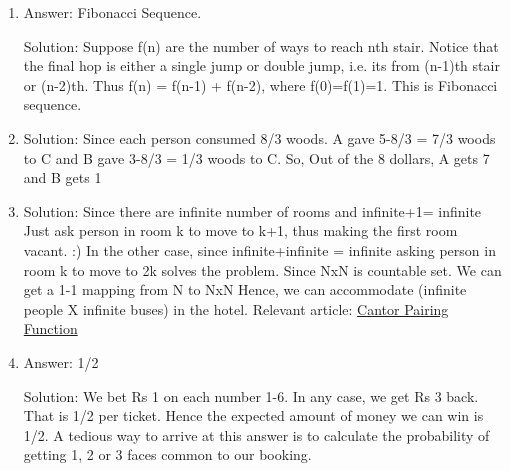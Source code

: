 \begin{enumerate}

\item
Answer: Fibonacci Sequence.
 
Solution: Suppose f(n) are the number of ways to reach nth stair. Notice that the final hop is either a single jump or double jump, i.e. its from (n-1)th stair or (n-2)th. Thus f(n) = f(n-1) + f(n-2), where f(0)=f(1)=1.  This is Fibonacci sequence.




\item
Solution: Since each person consumed 8/3 woods. A gave 5-8/3 = 7/3 woods to C and B gave 3-8/3 = 1/3 woods to C.
So, Out of the 8 dollars, A gets 7 and B gets 1




\item
Solution: Since there are infinite number of rooms and infinite+1= infinite
Just ask person in room k to move to k+1, thus making the first room vacant. :)
In the other case, since infinite+infinite = infinite
asking person in room k to move to 2k solves the problem.
Since NxN is countable set. We can get a 1-1 mapping from N to NxN
Hence, we can accommodate (infinite people X infinite buses) in the hotel.
Relevant article: 
\href{http://en.wikipedia.org/wiki/Cantor_pairing_function}{Cantor Pairing Function}




\item
Answer: 1/2
 
Solution: We bet Rs 1 on each number 1-6. In any case, we get Rs 3 back. That is 1/2 per ticket. Hence the expected amount of money we can win is 1/2. A tedious way to arrive at this answer is to calculate the probability of getting 1, 2 or 3 faces common to our booking.




\end{enumerate}
